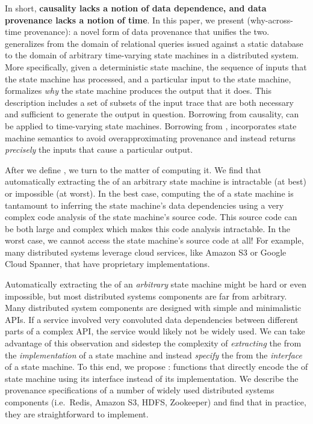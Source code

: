 In short, \textbf{causality lacks a notion of data dependence, and data
provenance lacks a notion of time}. In this paper, we present
 (why-across-time provenance): a novel form of data
provenance that unifies the two. \Watprovenance{} generalizes \whyprovenance{}
from the domain of relational queries issued against a static database to the
domain of arbitrary time-varying state machines in a distributed system. More
specifically, given a deterministic state machine, the sequence of inputs that
the state machine has processed, and a particular input to the state machine,
\watprovenance{} formalizes \emph{why} the state machine produces the output
that it does. This description includes a set of subsets of the input trace
that are both necessary and sufficient to generate the output in question.
Borrowing from causality, \watprovenance{} can be applied to time-varying state
machines. Borrowing from \whyprovenance{}, \watprovenance{} incorporates state
machine semantics to avoid overapproximating provenance and instead returns
\emph{precisely} the inputs that cause a particular output.

After we define \watprovenance{}, we turn to the matter of computing it. We
find that automatically extracting the \watprovenance{} of an arbitrary state
machine is intractable (at best) or impossible (at worst). In the best case,
computing the \watprovenance{} of a state machine is tantamount to inferring
the state machine's data dependencies using a very complex code analysis of the
state machine's source code. This source code can be both large and complex
which makes this code analysis intractable. In the worst case, we cannot access
the state machine's source code at all! For example, many distributed systems
leverage cloud services, like Amazon S3 or Google Cloud Spanner, that have
proprietary implementations.

Automatically extracting the \watprovenance{} of an \emph{arbitrary} state
machine might be hard or even impossible, but most distributed systems
components are far from arbitrary. Many distributed system components are
designed with simple and minimalistic APIs. If a service involved very
convoluted data dependencies between different parts of a complex API, the
service would likely not be widely used. We can take advantage of this
observation and sidestep the complexity of \emph{extracting} the
\watprovenance{} from the \emph{implementation} of a state machine and instead
\emph{specify} the \watprovenance{} from the \emph{interface} of a state
machine. To this end, we propose :
functions that directly encode the \watprovenance{} of state machine using its
interface instead of its implementation.  We describe the provenance
specifications of a number of widely used distributed systems components (i.e.\
Redis, Amazon S3, HDFS, Zookeeper) and find that in practice, they are
straightforward to implement.

